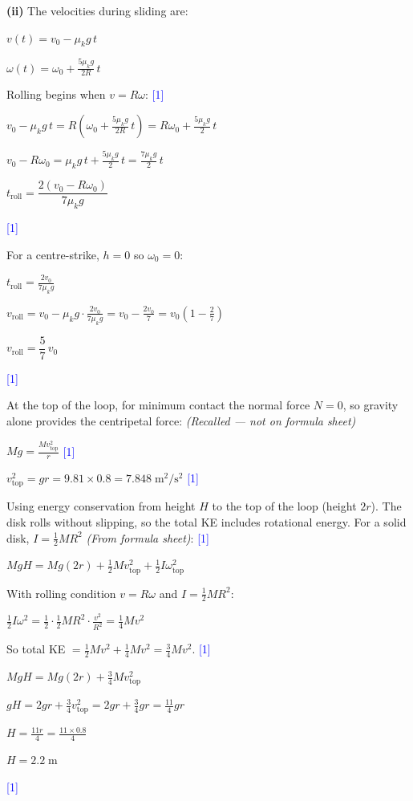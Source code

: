 \documentclass[12pt,a4paper]{article}
\newcommand{\markstep}[1]{\hfill\textcolor{blue}{[#1]}}
\newcommand{\finalanswer}[1]{%
  \begin{tcolorbox}[colback=green!5!white,colframe=green!50!black,boxrule=0.5pt]
  #1
  \end{tcolorbox}
}
\newcommand{\fromsheet}{\textit{(From formula sheet)}}
\newcommand{\recalled}{\textit{(Recalled --- not on formula sheet)}}
\begin{document}
\begin{parts}
\textbf{(ii)} The velocities during sliding are:

$v(t) = v_0 - \mu_k g\,t$

$\omega(t) = \omega_0 + \frac{5\mu_k g}{2R}\,t$

Rolling begins when $v = R\omega$: \markstep{1}

$v_0 - \mu_k g\,t = R\left(\omega_0 + \frac{5\mu_k g}{2R}\,t\right) = R\omega_0 + \frac{5\mu_k g}{2}\,t$

$v_0 - R\omega_0 = \mu_k g\,t + \frac{5\mu_k g}{2}\,t = \frac{7\mu_k g}{2}\,t$

\finalanswer{$t_\text{roll} = \dfrac{2(v_0 - R\omega_0)}{7\mu_k g}$} \markstep{1}

For a centre-strike, $h = 0$ so $\omega_0 = 0$:

$t_\text{roll} = \frac{2v_0}{7\mu_k g}$

$v_\text{roll} = v_0 - \mu_k g\cdot\frac{2v_0}{7\mu_k g} = v_0 - \frac{2v_0}{7} = v_0\left(1 - \frac{2}{7}\right)$

\finalanswer{$v_\text{roll} = \dfrac{5}{7}\,v_0$} \markstep{1}

\item

At the top of the loop, for minimum contact the normal force $N = 0$, so gravity alone provides the centripetal force: \recalled

$Mg = \frac{Mv_\text{top}^2}{r}$ \markstep{1}

$v_\text{top}^2 = gr = 9.81\times 0.8 = 7.848\;\text{m}^2/\text{s}^2$ \markstep{1}

Using energy conservation from height $H$ to the top of the loop (height $2r$). The disk rolls without slipping, so the total KE includes rotational energy. For a solid disk, $I = \frac{1}{2}MR^2$ \fromsheet: \markstep{1}

$MgH = Mg(2r) + \frac{1}{2}Mv_\text{top}^2 + \frac{1}{2}I\omega_\text{top}^2$

With rolling condition $v = R\omega$ and $I = \frac{1}{2}MR^2$:

$\frac{1}{2}I\omega^2 = \frac{1}{2}\cdot\frac{1}{2}MR^2\cdot\frac{v^2}{R^2} = \frac{1}{4}Mv^2$

So total KE $= \frac{1}{2}Mv^2 + \frac{1}{4}Mv^2 = \frac{3}{4}Mv^2$. \markstep{1}

$MgH = Mg(2r) + \frac{3}{4}Mv_\text{top}^2$

$gH = 2gr + \frac{3}{4}v_\text{top}^2 = 2gr + \frac{3}{4}gr = \frac{11}{4}gr$

$H = \frac{11r}{4} = \frac{11\times 0.8}{4}$

\finalanswer{$H = 2.2\;\text{m}$} \markstep{1}

\end{parts}
\end{document}
